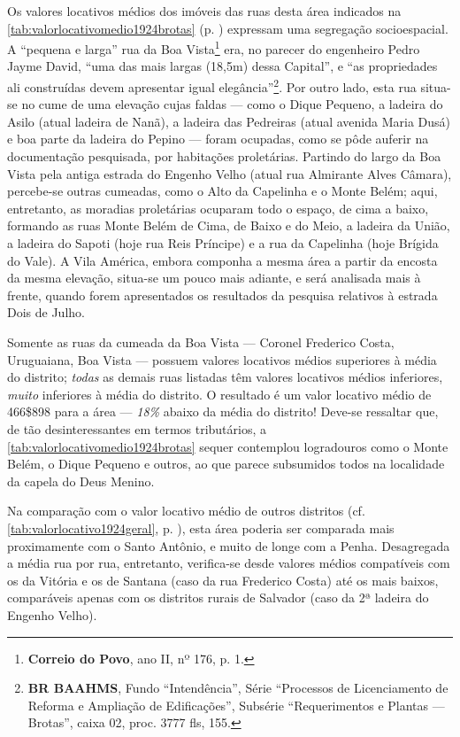 
Os valores locativos médios dos imóveis das ruas desta área indicados na \autoref{tab:valorlocativomedio1924brotas} (p. \pageref{tab:valorlocativomedio1924brotas}) expressam uma segregação socioespacial. A ``pequena e larga'' rua da Boa Vista\footnote{\textbf{Correio do Povo}, ano II, nº 176, p. 1.} era, no parecer do engenheiro Pedro Jayme David, ``uma das mais largas (18,5m) dessa Capital'', e ``as propriedades ali construídas devem apresentar igual elegância''\footnote{\textbf{BR BAAHMS}, Fundo ``Intendência'', Série ``Processos de Licenciamento de Reforma e Ampliação de Edificações'', Subsérie ``Requerimentos e Plantas --- Brotas'', caixa 02, proc. 3777 fls, 155.}. Por outro lado, esta rua situa-se no cume de uma elevação cujas faldas --- como o Dique Pequeno, a ladeira do Asilo (atual ladeira de Nanã), a ladeira das Pedreiras (atual avenida Maria Dusá) e boa parte da ladeira do Pepino ---  foram ocupadas, como se pôde auferir na documentação pesquisada, por habitações proletárias. Partindo do largo da Boa Vista pela antiga estrada do Engenho Velho (atual rua Almirante Alves Câmara), percebe-se outras cumeadas, como o Alto da Capelinha e o Monte Belém; aqui, entretanto, as moradias proletárias ocuparam todo o espaço, de cima a baixo, formando as ruas Monte Belém de Cima, de Baixo e do Meio, a ladeira da União, a ladeira do Sapoti (hoje rua Reis Príncipe) e a rua da Capelinha (hoje Brígida do Vale). A Vila América, embora componha a mesma área a partir da encosta da mesma elevação, situa-se um pouco mais adiante, e será analisada mais à frente, quando forem apresentados os resultados da pesquisa relativos à estrada Dois de Julho. 

Somente as ruas da cumeada da Boa Vista --- Coronel Frederico Costa, Uruguaiana, Boa Vista --- possuem valores locativos médios superiores à média do distrito; \textit{todas} as demais ruas listadas têm valores locativos médios inferiores, \textit{muito} inferiores à média do distrito. O resultado é um valor locativo médio de 466\$898 para a área --- \textit{18\%} abaixo da média do distrito! Deve-se ressaltar que, de tão desinteressantes em termos tributários, a \autoref{tab:valorlocativomedio1924brotas} sequer contemplou logradouros como o Monte Belém, o Dique Pequeno e outros, ao que parece subsumidos todos na localidade da capela do Deus Menino.

Na comparação com o valor locativo médio de outros distritos (cf. \autoref{tab:valorlocativo1924geral}, p. \pageref{tab:valorlocativo1924geral}), esta área poderia ser comparada mais proximamente com o Santo Antônio, e muito de longe com a Penha. Desagregada a média rua por rua, entretanto, verifica-se desde valores médios compatíveis com os da Vitória e os de Santana (caso da rua Frederico Costa) até os mais baixos, comparáveis apenas com os distritos rurais de Salvador (caso da 2ª ladeira do Engenho Velho).


